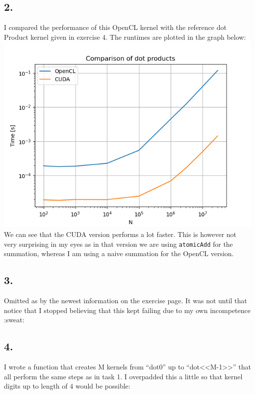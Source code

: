 \documentclass[11pt]{article}
\begin{document}
\subsection{2.}
I compared the performance of this OpenCL kernel with the reference dot Product kernel given in exercise 4. The runtimes are plotted in the graph below: \\

\includegraphics[scale=0.6]{plots/2.png}
\\
We can see that the CUDA version performs a lot faster. This is however not very surprising in my eyes as in that version we are using \lstinline{atomicAdd} for the summation, whereas I am using a naive summation for the OpenCL version.

\subsection{3.}
Omitted as by the newest information on the exercise page. It was not until that notice that I stopped believing that this kept failing due to my own incompetence :sweat:
\newpage
\subsection{4.}

I wrote a function that creates M kernels from ``dot0'' up to ``dot<<M-1>>'' that all perform the same steps as in task 1. I overpadded this a little so that kernel digits up to length of $4$ would be possible:
\end{document}

